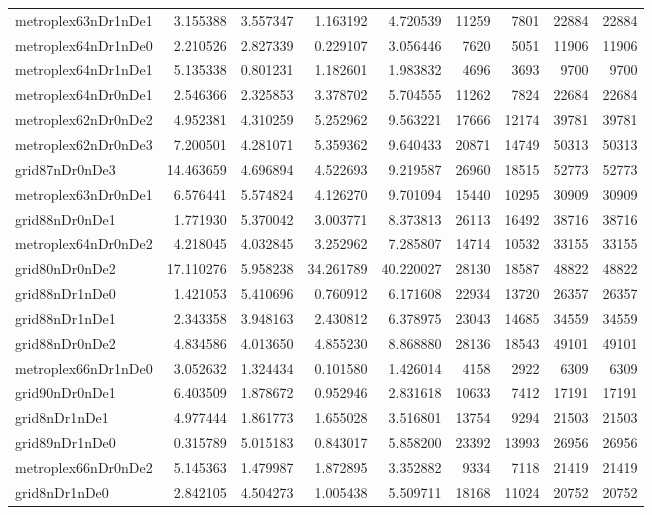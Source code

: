 \begin{longtable}{|l|r|r|r|r|r|r|r|r|}
metroplex63nDr1nDe1 & 3.155388 & 3.557347 & 1.163192 & 4.720539 & 11259 & 7801 & 22884 & 22884 \\
metroplex64nDr1nDe0 & 2.210526 & 2.827339 & 0.229107 & 3.056446 & 7620 & 5051 & 11906 & 11906 \\
metroplex64nDr1nDe1 & 5.135338 & 0.801231 & 1.182601 & 1.983832 & 4696 & 3693 & 9700 & 9700 \\
metroplex64nDr0nDe1 & 2.546366 & 2.325853 & 3.378702 & 5.704555 & 11262 & 7824 & 22684 & 22684 \\
metroplex62nDr0nDe2 & 4.952381 & 4.310259 & 5.252962 & 9.563221 & 17666 & 12174 & 39781 & 39781 \\
metroplex62nDr0nDe3 & 7.200501 & 4.281071 & 5.359362 & 9.640433 & 20871 & 14749 & 50313 & 50313 \\
grid87nDr0nDe3 & 14.463659 & 4.696894 & 4.522693 & 9.219587 & 26960 & 18515 & 52773 & 52773 \\
metroplex63nDr0nDe1 & 6.576441 & 5.574824 & 4.126270 & 9.701094 & 15440 & 10295 & 30909 & 30909 \\
grid88nDr0nDe1 & 1.771930 & 5.370042 & 3.003771 & 8.373813 & 26113 & 16492 & 38716 & 38716 \\
metroplex64nDr0nDe2 & 4.218045 & 4.032845 & 3.252962 & 7.285807 & 14714 & 10532 & 33155 & 33155 \\
grid80nDr0nDe2 & 17.110276 & 5.958238 & 34.261789 & 40.220027 & 28130 & 18587 & 48822 & 48822 \\
grid88nDr1nDe0 & 1.421053 & 5.410696 & 0.760912 & 6.171608 & 22934 & 13720 & 26357 & 26357 \\
grid88nDr1nDe1 & 2.343358 & 3.948163 & 2.430812 & 6.378975 & 23043 & 14685 & 34559 & 34559 \\
grid88nDr0nDe2 & 4.834586 & 4.013650 & 4.855230 & 8.868880 & 28136 & 18543 & 49101 & 49101 \\
metroplex66nDr1nDe0 & 3.052632 & 1.324434 & 0.101580 & 1.426014 & 4158 & 2922 & 6309 & 6309 \\
grid90nDr0nDe1 & 6.403509 & 1.878672 & 0.952946 & 2.831618 & 10633 & 7412 & 17191 & 17191 \\
grid8nDr1nDe1 & 4.977444 & 1.861773 & 1.655028 & 3.516801 & 13754 & 9294 & 21503 & 21503 \\
grid89nDr1nDe0 & 0.315789 & 5.015183 & 0.843017 & 5.858200 & 23392 & 13993 & 26956 & 26956 \\
metroplex66nDr0nDe2 & 5.145363 & 1.479987 & 1.872895 & 3.352882 & 9334 & 7118 & 21419 & 21419 \\
grid8nDr1nDe0 & 2.842105 & 4.504273 & 1.005438 & 5.509711 & 18168 & 11024 & 20752 & 20752 \\

\end{longtable}
